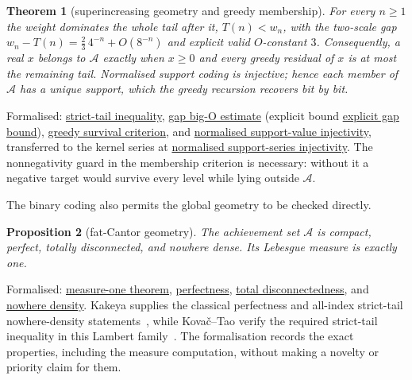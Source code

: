 \documentclass[11pt]{article}
\newcommand{\commit}{99f4bf47422abbd8757cbb22b50ba079d764d3a7}
\newcommand{\repobase}{https://github.com/wcook04/plectis-erdos/blob/\commit}
\newcommand{\PK}{Erdos249257}
\newcommand{\lword}[4]{\href{\repobase/\PK/#1\#L#2}{#4}}
\newtheorem{theorem}{Theorem}[section]
\newtheorem{proposition}[theorem]{Proposition}
\theoremstyle{definition}
\theoremstyle{remark}
\begin{document}
\begin{theorem}[superincreasing geometry and greedy membership]\label{res:greedy-details}
For every $n\ge1$ the weight dominates the whole tail after it, $T(n)<w_n$,
with the two-scale gap $w_n-T(n)=\tfrac23\,4^{-n}+O(8^{-n})$ and explicit
valid $O$-constant $3$. Consequently, a real $x$ belongs to $\mathcal A$
exactly when $x\ge0$ and every greedy residual of $x$ is at most the remaining
tail. Normalised support coding is injective; hence each member of $\mathcal A$
has a unique support, which the greedy recursion recovers bit by bit.
\end{theorem}
\noindent Formalised:
\lword{GreedyAchievementSet.lean}{180}{mersenneTail_lt_weight}{strict-tail inequality},
\lword{GreedyAchievementSet.lean}{473}{mersenneGap_isBigOWith}{gap big-O estimate} (explicit bound
\lword{GreedyAchievementSet.lean}{448}{mersenneGap_asymptotic_bound}{explicit gap bound}),
\lword{GreedyAchievementSet.lean}{1458}{mem_mersenneAchievementSet_iff_greedy_survival}{greedy survival criterion},
and
\lword{GreedyAchievementSet.lean}{1563}{positiveMersenneSupportValue_injective_normalized}{normalised support-value injectivity},
transferred to the kernel series at
\lword{GreedyAchievementSet.lean}{1572}{erdosSupportSeries_two_injective_normalized}{normalised support-series injectivity}.
The nonnegativity guard in the membership criterion is necessary: without it a
negative target would survive every level while lying outside $\mathcal A$.

The binary coding also permits the global geometry to be checked directly.

\begin{proposition}[fat-Cantor geometry]\label{res:greedytopology}
The achievement set $\mathcal A$ is compact, perfect, totally disconnected,
and nowhere dense.  Its Lebesgue measure is exactly one.
\end{proposition}
\noindent Formalised:
\lword{GreedyAchievementSet.lean}{996}{volume_mersenneAchievementSet}{measure-one theorem},
\lword{GreedyAchievementSet.lean}{1656}{perfect_mersenneAchievementSet}{perfectness},
\lword{GreedyAchievementSet.lean}{1672}{isTotallyDisconnected_mersenneAchievementSet}{total disconnectedness},
and
\lword{GreedyAchievementSet.lean}{1681}{isNowhereDense_mersenneAchievementSet}{nowhere density}.
Kakeya supplies the classical perfectness and all-index strict-tail
nowhere-density statements~\cite[p.~251]{kakeya1914}, while
Kova\v{c}--Tao verify the required strict-tail inequality in this Lambert
family~\cite[Remark~4.1, p.~13]{kovactao}.  The formalisation records the exact
properties, including the measure computation, without making a novelty or
priority claim for them.
\end{document}
